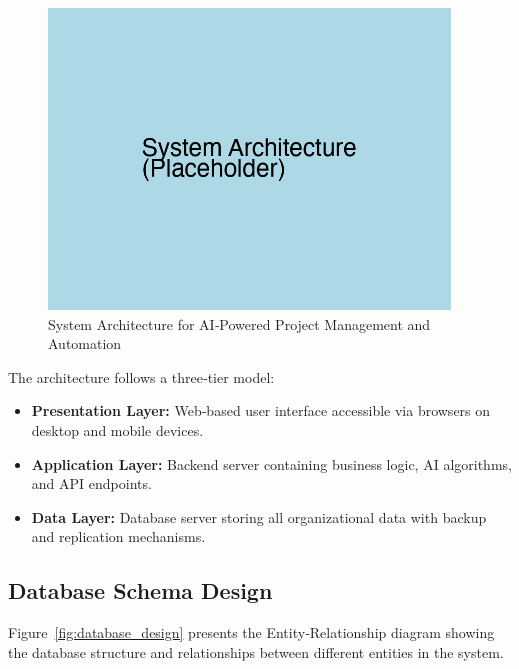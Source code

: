 \documentclass[12pt,a4paper]{article}
\begin{document}
\begin{figure}[H]
    \centering
    \includegraphics[width=0.95\textwidth]{Fig/system_architecture.png}
    \caption{System Architecture for AI‑Powered Project Management and Automation}
    \label{fig:system_architecture}
\end{figure}

The architecture follows a three‑tier model:
\begin{itemize}
    \item \textbf{Presentation Layer:} Web‑based user interface accessible via browsers on desktop and mobile devices.
    \item \textbf{Application Layer:} Backend server containing business logic, AI algorithms, and API endpoints.
    \item \textbf{Data Layer:} Database server storing all organizational data with backup and replication mechanisms.
\end{itemize}

\subsection{Database Schema Design}
Figure~\ref{fig:database_design} presents the Entity‑Relationship diagram showing the database structure and relationships between different entities in the system.
\end{document}
